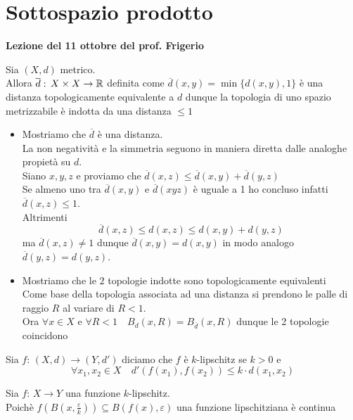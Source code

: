 

\section{Sottospazio prodotto}
\textbf{Lezione del 11 ottobre del prof. Frigerio}

\begin{prop}Sia $(X,d)$ metrico.\\
Allora $\overline{d}:\, X \times X \to \mathbb{R} $ definita come $\overline{d}(x,y)=\min\{ d(x,y), 1\}$ \`e una distanza topologicamente equivalente a $d$ dunque la topologia di uno spazio metrizzabile \`e indotta da una distanza $\leq 1$
\proof  \bbianco
\begin{itemize}
\item

Mostriamo che $\overline{d}$ \`e una distanza.\\
La non negativit\`a e la simmetria seguono in maniera diretta dalle analoghe propiet\`a su $d$.\\
Siano $x,y,z$ e proviamo che $\overline{d}(x,z)\leq \overline{d}(x,y) +\overline{d}(y,z)$\\
Se almeno uno tra $\overline{d}(x,y)$ e $\overline{d}(xyz)$ \`e uguale a 1 ho concluso infatti $\overline{d}(x,z)\leq 1$.\\
Altrimenti
$$ \overline{d}(x,z) \leq d(x,z)\leq d(x,y)+ d(y,z)$$
ma $\overline{d}(x,z) \neq 1 $ dunque $\overline{d}(x,y) = d(x,y)$ in modo analogo $\overline{d}(y,z)=d(y,z)$.
\item Mostriamo che le $2$ topologie indotte sono topologicamente equivalenti\\
Come base della topologia associata ad una distanza si prendono le palle di raggio $R$ al variare di $R<1$.\\
Ora $\forall x \in X $ e $\forall R<1 \quad B_d(x,R)= B_{\overline{d}}(x,R)$ dunque le 2 topologie coincidono
\end{itemize}
\endproof
\end{prop}
\spazio
\begin{defn}\bianco
Sia $f:\, (X,d)\to (Y, d') $ diciamo che $f$ \`e $k$-lipschitz se $k>0$ e
$$ \forall x_1, x_2 \in X \quad d'(f(x_1),f(x_2))\leq k \cdot d(x_1,x_2)$$
\end{defn}
\begin{oss}Sia $f:\, X \to Y $ una funzione $k$-lipschitz.\\
Poich\`e $f\left( B\left( x, \frac{\varepsilon}{k} \right) \right) \subseteq B(f(x),\varepsilon)$ una funzione lipschitziana \`e continua 
\end{oss}
